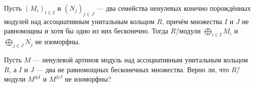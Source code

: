 \documentclass[
	extrafontsizes,
	11pt,
	hyphens,
]{memoir}
\begin{document}


\begin{corollary}
Пусть \((M_i)_{i \in I}\) и \((N_j)_{j \in J}\) --- два семейства ненулевых конечно порождённых модулей над ассоциативным унитальным кольцом \(R\), причём множества \(I\) и \(J\) не равномощны и хотя бы одно из них бесконечно.%
Тогда \(R\)\=/модули \(\bigoplus_{i \in I} M_i\) и \(\bigoplus_{j \in J} N_j\) не изоморфны.
\end{corollary}

\begin{question}
Пусть \(M\) --- ненулевой артинов модуль над ассоциативным унитальным кольцом \(R\), а \(I\) и \(J\) --- два не равномощных бесконечных множества.
Верно ли, что \(R\)\=/модули \(M^{\oplus I}\) и \(M^{\oplus J}\) не изоморфны?
\end{question}
\end{document}
